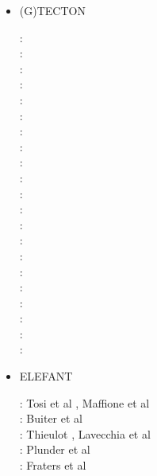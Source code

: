 \begin{itemize}
\item {\codefont (G)TECTON}  

\begin{scriptsize}
\nineteeneighty: \cite{mera80}\\
\nineteeneightyone: \cite{mera81}\\
\nineteenninetythree: \cite{gowo93}\\
\nineteenninetyfive: \cite{gowo95}\\
\nineteenninetysix: \cite{guez96}\cite{gisb96}\\
\nineteenninetynine: \cite{gowo99}\cite{fugo99}\\
\twothousandone: \cite{bugw01}\cite{gome01}\\
\twothousandtwo: \cite{bugw02}\\
\twothousandfive: \cite{gowo05}\cite{vanw05}\cite{vabl05}\cite{gowo05}\\
\twothousandsix: \cite{degw06}\cite{libi06}\cite{scdm06}\\
\twothousandseven: \cite{vabl07}\\
\twothousandeight: \cite{degw08}\cite{degw08b}\\
\twothousandnine: \cite{ladg09}\cite{plmg09}\\
\twothousandten: \cite{vago10}\cite{plmf10}\\
\twothousandeleven: \cite{bagw11}\cite{bagw11b}\\
\twothousandthirteen: \cite{plab13}\cite{wagw13}\\
\twothousandfourteen: \cite{vagw14}\\
\twothousandfifteen: \cite{mags15}\cite{nigo15}\\
\twothousandsixteen: \cite{gemg16}\cite{masg16}\\
\twothousandseventeen: \cite{ozgw17}\\
\twothousandeighteen: \cite{gofv18}\cite{nigw18}\cite{hefg18}
\end{scriptsize}

\item {\codefont ELEFANT} 

\begin{scriptsize}
\noindent
\twothousandfifteen:
Tosi et al \cite{tosn15}, Maffione et al \cite{matv15}\\
\twothousandsixteen:
Buiter et al \cite{busa16}\\
\twothousandseventeen:
Thieulot \cite{thie17}, Lavecchia et al \cite{latb17}\\
\twothousandeighteen:
Plunder et al \cite{pltv18}\\
\twothousandnineteen:
Fraters et al \cite{frtv19}
\end{scriptsize}


\end{itemize}
